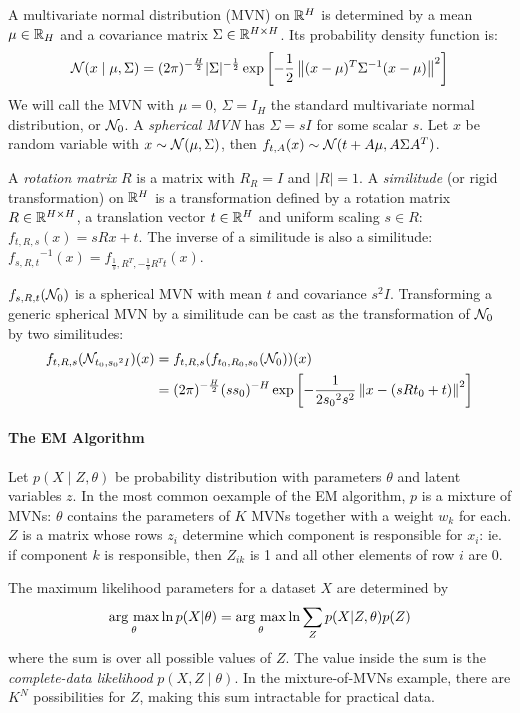 A multivariate normal distribution (MVN) on ${\mathbb R}^H$ is determined by a mean $\mu \in {\mathbb R}_H$ and a covariance matrix $\Sigma \in {\mathbb R}^{H\times H}$. Its probability density function is:
\[
{\cal N}(x \mid \mu, \Sigma) = (2\pi)^{-\frac{H}{2}}|\Sigma|^{-\frac{1}{2}} \exp \left [-\frac{1}{2} \left \| (x-\mu)^T\Sigma^{-1}(x-\mu) \right\|^2\right] 
\]
We will call the MVN with $\mu = 0$, $\Sigma = I_H$ the standard multivariate normal distribution, or ${\cal N}_0$. A \emph{spherical MVN} has $\Sigma = sI$ for some scalar $s$. Let $x$ be random variable with $x \sim {\cal N}(\mu, \Sigma)$, then $f_{t, A}(x) \sim {\cal N}(t + A\mu, A\Sigma A^T)$. 

A \emph{rotation matrix} $R$ is a matrix with $R_R = I$ and $|R| = 1$. A \emph{similitude} (or rigid transformation) on ${\mathbb R}^H$ is a transformation defined by a rotation matrix $R \in {\mathbb R}^{H\times H}$, a translation vector $t \in {\mathbb R}^H$ and uniform scaling $s \in R$: $f_{t, R, s}(x) = sRx + t$. 
The inverse of a similitude is also a similitude: ${f_{s, R, t}}^{-1}(x) = f_{\frac{1}{s}, R^T, -\frac{1}{s}R^Tt}(x)$.

$f_{s, R, t}({\cal N}_0)$ is a spherical MVN with mean $t$ and covariance $s^2I$. Transforming a generic spherical MVN by a similitude can be cast as the transformation of ${\cal N}_0$ by two similitudes:
\begin{align}
f_{t, R, s}({\cal N}_{t_0, {s_0}^2 I})(x) &= f_{t, R, s}(f_{t_0, R_0, s_0}({\cal N}_0))(x) \notag \\
&=  (2\pi)^{-\frac{H}{2}} ({ss_0})^{-H} \exp \left[- \frac{1}{2{s_0}^2s^2}\left\| x - (s R t_0 + t)\right \|^2\right] \label{line:inverse}
\end{align}
\paragraph{The EM Algorithm} \cite{dempster1977maximum}
Let $p(X\mid Z, \theta)$ be probability distribution with parameters $\theta$ and latent variables $z$. In the most common oexample of the EM algorithm, $p$ is a mixture of MVNs: $\theta$ contains the parameters of $K$ MVNs together with a weight $w_k$ for each. $Z$ is a matrix whose rows $z_i$ determine which component is responsible for $x_i$: ie. if component $k$ is responsible, then $Z_{ik}$ is 1 and all other elements of row $i$ are 0.

The maximum likelihood parameters for a dataset $X$ are determined by 
\[
\operatorname*{\arg\,\max}_{\theta} \ln p(X|\theta) = \operatorname*{\arg\,\max}_{\theta} \ln \sum_Z p(X|Z, \theta)p(Z) 
\]
where the sum is over all possible values of $Z$. The value inside the sum is the \emph{complete-data likelihood} $p(X, Z\mid \theta)$. In the mixture-of-MVNs example, there are $K^N$ possibilities for $Z$, making this sum intractable for practical data. 
 
